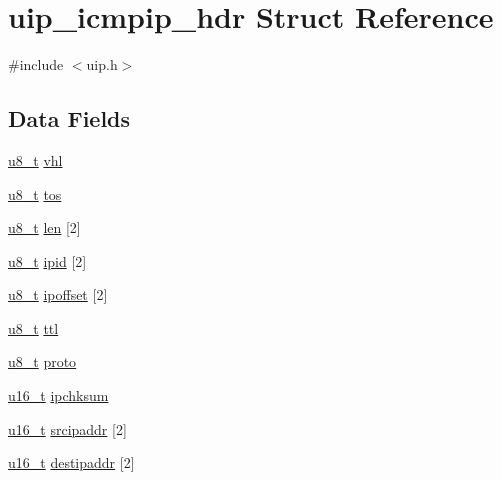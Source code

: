\hypertarget{structuip__icmpip__hdr}{
\section{uip\_\-icmpip\_\-hdr Struct Reference}
\label{structuip__icmpip__hdr}
}


{\ttfamily \#include $<$uip.h$>$}

\subsection*{Data Fields}
\begin{DoxyCompactItemize}
\item 
\hyperlink{group__uipfw_ga4caecabca98b43919dd11be1c0d4cd8e}{u8\_\-t} \hyperlink{structuip__icmpip__hdr_a7d472d8b3c41618d39c93c4ca92fb3f4}{vhl}
\item 
\hyperlink{group__uipfw_ga4caecabca98b43919dd11be1c0d4cd8e}{u8\_\-t} \hyperlink{structuip__icmpip__hdr_aa3f2d9cb20290019b2743e8df31a2f8b}{tos}
\item 
\hyperlink{group__uipfw_ga4caecabca98b43919dd11be1c0d4cd8e}{u8\_\-t} \hyperlink{structuip__icmpip__hdr_ab15853725b233d526b291db0347d4ecd}{len} \mbox{[}2\mbox{]}
\item 
\hyperlink{group__uipfw_ga4caecabca98b43919dd11be1c0d4cd8e}{u8\_\-t} \hyperlink{structuip__icmpip__hdr_a308463cc7b3d45d2dbcdcedd4cde9bb9}{ipid} \mbox{[}2\mbox{]}
\item 
\hyperlink{group__uipfw_ga4caecabca98b43919dd11be1c0d4cd8e}{u8\_\-t} \hyperlink{structuip__icmpip__hdr_a4619e69ec86a47f6abe945b39ec7f63a}{ipoffset} \mbox{[}2\mbox{]}
\item 
\hyperlink{group__uipfw_ga4caecabca98b43919dd11be1c0d4cd8e}{u8\_\-t} \hyperlink{structuip__icmpip__hdr_a55be3d5413ce49c5c4f5576def12d7ec}{ttl}
\item 
\hyperlink{group__uipfw_ga4caecabca98b43919dd11be1c0d4cd8e}{u8\_\-t} \hyperlink{structuip__icmpip__hdr_a55e7764a9f6ed05aaa98076b9f6770a5}{proto}
\item 
\hyperlink{group__uipfw_ga77570ac4fcab86864fa1916e55676da2}{u16\_\-t} \hyperlink{structuip__icmpip__hdr_ababb9c2be394477af97f79507bcb4c86}{ipchksum}
\item 
\hyperlink{group__uipfw_ga77570ac4fcab86864fa1916e55676da2}{u16\_\-t} \hyperlink{structuip__icmpip__hdr_a0ec6a6cbcbfd191d393738c16d54e5e1}{srcipaddr} \mbox{[}2\mbox{]}
\item 
\hyperlink{group__uipfw_ga77570ac4fcab86864fa1916e55676da2}{u16\_\-t} \hyperlink{structuip__icmpip__hdr_ae27f4949613fe3c1de5a839af01d99dd}{destipaddr} \mbox{[}2\mbox{]}

\end{DoxyCompactItemize}
